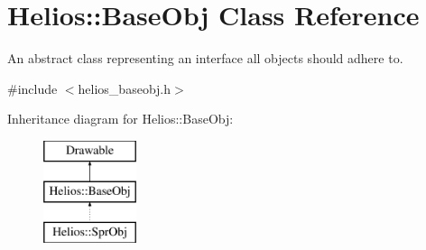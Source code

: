 \hypertarget{class_helios_1_1_base_obj}{}\section{Helios\+:\+:Base\+Obj Class Reference}
\label{class_helios_1_1_base_obj}


An abstract class representing an interface all objects should adhere to.  




{\ttfamily \#include $<$helios\+\_\+baseobj.\+h$>$}

Inheritance diagram for Helios\+:\+:Base\+Obj\+:\begin{figure}[H]
\begin{center}
\leavevmode
\includegraphics[height=3.000000cm]{class_helios_1_1_base_obj}
\end{center}
\end{figure}
